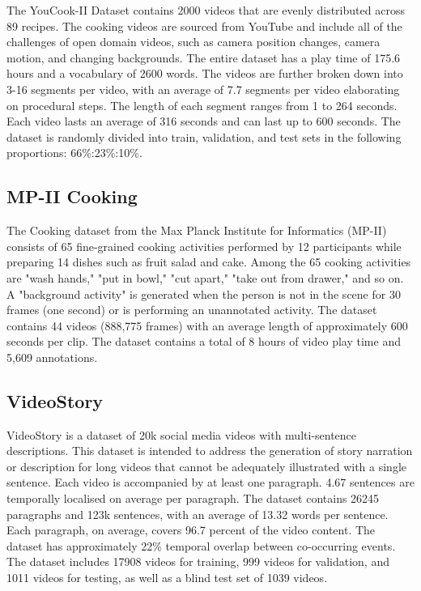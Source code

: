 \par The YouCook-II Dataset contains 2000 videos that are evenly distributed across 89 recipes. The cooking videos are sourced from YouTube and include all of the challenges of open domain videos, such as camera position changes, camera motion, and changing backgrounds. The entire dataset has a play time of 175.6 hours and a vocabulary of 2600 words. The videos are further broken down into 3-16 segments per video, with an average of 7.7 segments per video elaborating on procedural steps. The length of each segment ranges from 1 to 264 seconds. Each video lasts an average of 316 seconds and can last up to 600 seconds. The dataset is randomly divided into train, validation, and test sets in the following proportions: 66\%:23\%:10\%.

\subsection{MP-II Cooking}

\par The Cooking dataset from the Max Planck Institute for Informatics (MP-II) consists of 65 fine-grained cooking activities performed by 12 participants while preparing 14 dishes such as fruit salad and cake. Among the 65 cooking activities are "wash hands," "put in bowl," "cut apart," "take out from drawer," and so on. A "background activity" is generated when the person is not in the scene for 30 frames (one second) or is performing an unannotated activity. The dataset contains 44 videos (888,775 frames) with an average length of approximately 600 seconds per clip. The dataset contains a total of 8 hours of video play time and 5,609 annotations.

\subsection{VideoStory}

\par VideoStory is a dataset of 20k social media videos with multi-sentence descriptions. This dataset is intended to address the generation of story narration or description for long videos that cannot be adequately illustrated with a single sentence. Each video is accompanied by at least one paragraph. 4.67 sentences are temporally localised on average per paragraph. The dataset contains 26245 paragraphs and 123k sentences, with an average of 13.32 words per sentence. Each paragraph, on average, covers 96.7 percent of the video content. The dataset has approximately 22\% temporal overlap between co-occurring events. The dataset includes 17908 videos for training, 999 videos for validation, and 1011 videos for testing, as well as a blind test set of 1039 videos.

